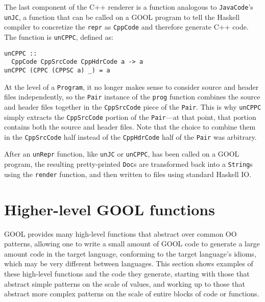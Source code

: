 \documentclass[sigplan,review,anonymous]{acmart}
\begin{document}
The last component of the C++ renderer is a function analogous to 
\verb|JavaCode|'s \verb|unJC|, a function that can be called on a GOOL program 
to tell the Haskell compiler to concretize the \verb|repr| as \verb|CppCode| 
and therefore generate C++ code. The function is \verb|unCPPC|, defined as:
\begin{lstlisting}
unCPPC :: 
  CppCode CppSrcCode CppHdrCode a -> a
unCPPC (CPPC (CPPSC a) _) = a
\end{lstlisting}
At the level of a \verb|Program|, it no longer makes sense to consider source 
and header files independently, so the \verb|Pair| instance of the \verb|prog| 
function combines the source and header files together in the \verb|CppSrcCode| 
piece of the \verb|Pair|. This is why \verb|unCPPC| simply extracts the 
\verb|CppSrcCode| portion of the \verb|Pair|---at that point, that portion 
contains both the source and header files. Note that the choice to combine them 
in the \verb|CppSrcCode| half instead of the \verb|CppHdrCode| half of the 
\verb|Pair| was arbitrary.

After an \verb|unRepr| function, like \verb|unJC| or \verb|unCPPC|, has been 
called on a GOOL program, the resulting pretty-printed \verb|Doc|s are 
transformed back into a \verb|String|s using the \verb|render| function, and 
then written to files using standard Haskell IO.

\section{Higher-level GOOL functions} \label{patterns}

GOOL provides many high-level functions that abstract over common OO patterns, 
allowing one to write a small amount of GOOL code to generate a large amount 
code in the target language, conforming to the target language's idioms, which 
may be very different between languages. This section shows examples of these 
high-level functions and the code they generate, starting with those that 
abstract simple patterns on the scale of values, and working up to those that 
abstract more complex patterns on the scale of entire blocks of code or 
functions.
\end{document}
